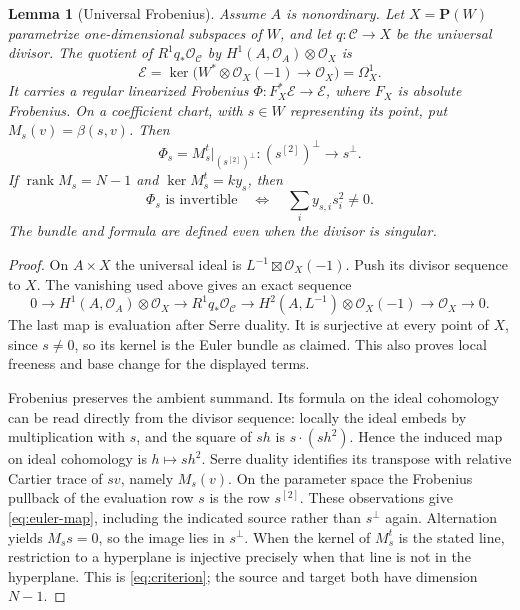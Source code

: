 \documentclass[11pt]{article}
\newtheorem{lemma}[theorem]{Lemma}
\theoremstyle{definition}\newtheorem{definition}[theorem]{Definition}
\theoremstyle{remark}\newtheorem{remark}[theorem]{Remark}
\newcommand{\OO}{\mathcal O}
\newcommand{\PP}{\mathbf P}
\newcommand{\rk}{\operatorname{rank}}
\begin{document}
\begin{lemma}[Universal Frobenius]\label{lem:euler}
Assume $A$ is nonordinary. Let $X=\PP(W)$ parametrize one-dimensional subspaces of $W$, and let $q:\mathcal C\to X$ be the universal divisor. The quotient of $R^1q_*\OO_{\mathcal C}$ by $H^1(A,\OO_A)\otimes\OO_X$ is
\[
 \mathcal E=\ker\bigl(W^*\otimes\OO_X(-1)\longrightarrow\OO_X\bigr)
 =\Omega_X^1.
\]
It carries a regular linearized Frobenius $\Phi:F_X^*\mathcal E\to\mathcal E$, where $F_X$ is absolute Frobenius. On a coefficient chart, with $s\in W$ representing its point, put $M_s(v)=\beta(s,v)$. Then
\begin{equation}\label{eq:euler-map}
 \Phi_s=M_s^t\big|_{(s^{[2]})^\perp}:
 (s^{[2]})^\perp\longrightarrow s^\perp.
\end{equation}
If $\rk M_s=N-1$ and $\ker M_s^t=ky_s$, then
\begin{equation}\label{eq:criterion}
 \Phi_s\text{ is invertible}\quad\Longleftrightarrow\quad
 \sum_i y_{s,i}s_i^2\ne0.
\end{equation}
The bundle and formula are defined even when the divisor is singular.
\end{lemma}
\begin{proof}
On $A\times X$ the universal ideal is $L^{-1}\boxtimes\OO_X(-1)$. Push its divisor sequence to $X$. The vanishing used above gives an exact sequence
\[
 0\to H^1(A,\OO_A)\otimes\OO_X\to R^1q_*\OO_{\mathcal C}
 \to H^2(A,L^{-1})\otimes\OO_X(-1)\to\OO_X\to0.
\]
The last map is evaluation after Serre duality. It is surjective at every point of $X$, since $s\ne0$, so its kernel is the Euler bundle as claimed. This also proves local freeness and base change for the displayed terms.

Frobenius preserves the ambient summand. Its formula on the ideal cohomology can be read directly from the divisor sequence: locally the ideal embeds by multiplication with $s$, and the square of $sh$ is $s\cdot(sh^2)$. Hence the induced map on ideal cohomology is $h\mapsto s h^2$. Serre duality identifies its transpose with relative Cartier trace of $sv$, namely $M_s(v)$. On the parameter space the Frobenius pullback of the evaluation row $s$ is the row $s^{[2]}$. These observations give \eqref{eq:euler-map}, including the indicated source rather than $s^\perp$ again. Alternation yields $M_ss=0$, so the image lies in $s^\perp$. When the kernel of $M_s^t$ is the stated line, restriction to a hyperplane is injective precisely when that line is not in the hyperplane. This is \eqref{eq:criterion}; the source and target both have dimension $N-1$.
\end{proof}
\end{document}
